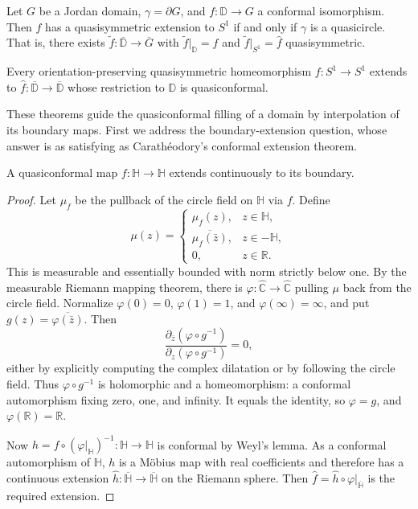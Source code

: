 \documentclass[11pt,a4paper]{article}
\begin{document}
\setcounter{theorem}{41}\begin{theorem}\label{thm:cd11-domain-boundary}
Let \(G\) be a Jordan domain, \(\gamma=\partial G\), and \(f:\mathbb D\to G\) a conformal isomorphism. Then \(f\) has a quasisymmetric extension to \(S^1\) if and only if \(\gamma\) is a quasicircle. That is, there exists \(\widetilde f:\overline{\mathbb D}\to\overline G\) with \(\widetilde f|_{\mathbb D}=f\) and \(\widetilde f|_{S^1}=\widehat f\) quasisymmetric.
\end{theorem}
\setcounter{theorem}{42}\begin{theorem}\label{thm:cd11-boundary-domain}
Every orientation-preserving quasisymmetric homeomorphism \(f:S^1\to S^1\) extends to \(\widehat f:\overline{\mathbb D}\to\overline{\mathbb D}\) whose restriction to \(\mathbb D\) is quasiconformal.
\end{theorem}
These theorems guide the quasiconformal filling of a domain by interpolation of its boundary maps. First we address the boundary-extension question, whose answer is as satisfying as Carath\'eodory's conformal extension theorem.
\setcounter{theorem}{43}\begin{proposition}
A quasiconformal map \(f:\mathbb H\to\mathbb H\) extends continuously to its boundary.
\end{proposition}
\begin{proof}
Let $\mu_f$ be the pullback of the circle field on $\mathbb H$ via $f$.
Define
\[
\mu(z)=
\begin{cases}
\mu_f(z),&z\in\mathbb H,\\
\overline{\mu_f(\bar z)},&z\in-\mathbb H,\\
0,&z\in\mathbb R.
\end{cases}
\]
This is measurable and essentially bounded with norm strictly below one.
By the measurable Riemann mapping theorem, there is
$\varphi:\widehat{\mathbb C}\to\widehat{\mathbb C}$ pulling $\mu$ back
from the circle field. Normalize $\varphi(0)=0$, $\varphi(1)=1$, and
$\varphi(\infty)=\infty$, and put $g(z)=\overline{\varphi(\bar z)}$.
Then
\[
\frac{\partial_{\bar z}(\varphi\circ g^{-1})}
{\partial_z(\varphi\circ g^{-1})}=0,
\]
either by explicitly computing the complex dilatation or by following
the circle field. Thus $\varphi\circ g^{-1}$ is holomorphic and a
homeomorphism: a conformal automorphism fixing zero, one, and infinity.
It equals the identity, so $\varphi=g$, and
$\varphi(\mathbb R)=\mathbb R$.

Now $h=f\circ(\varphi|_{\mathbb H})^{-1}:\mathbb H\to\mathbb H$ is
conformal by Weyl's lemma. As a conformal automorphism of $\mathbb H$,
$h$ is a M\"obius map with real coefficients and therefore has a
continuous extension
$\widehat h:\overline{\mathbb H}\to\overline{\mathbb H}$ on the Riemann
sphere. Then
$\widehat f=\widehat h\circ\varphi|_{\overline{\mathbb H}}$ is the
required extension.
\end{proof}
\end{document}
